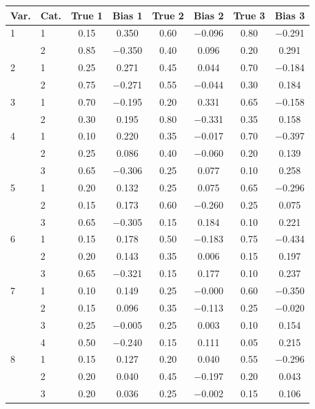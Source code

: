 \begin{table}[H]
\centering
\begin{tabular}{llcccccc}
  \toprule
\textbf{Var.} & \textbf{Cat.} & \textbf{True 1} & \textbf{Bias 1} & \textbf{True 2} & \textbf{Bias 2} & \textbf{True 3} & \textbf{Bias 3} \\ 
  \midrule
1 & 1 & 0.15 & 0.350 & 0.60 & $-$0.096 & 0.80 & $-$0.291 \\ 
   & 2 & 0.85 & $-$0.350 & 0.40 & 0.096 & 0.20 & 0.291 \\ 
  2 & 1 & 0.25 & 0.271 & 0.45 & 0.044 & 0.70 & $-$0.184 \\ 
   & 2 & 0.75 & $-$0.271 & 0.55 & $-$0.044 & 0.30 & 0.184 \\ 
  3 & 1 & 0.70 & $-$0.195 & 0.20 & 0.331 & 0.65 & $-$0.158 \\ 
   & 2 & 0.30 & 0.195 & 0.80 & $-$0.331 & 0.35 & 0.158 \\ 
  4 & 1 & 0.10 & 0.220 & 0.35 & $-$0.017 & 0.70 & $-$0.397 \\ 
   & 2 & 0.25 & 0.086 & 0.40 & $-$0.060 & 0.20 & 0.139 \\ 
   & 3 & 0.65 & $-$0.306 & 0.25 & 0.077 & 0.10 & 0.258 \\ 
  5 & 1 & 0.20 & 0.132 & 0.25 & 0.075 & 0.65 & $-$0.296 \\ 
   & 2 & 0.15 & 0.173 & 0.60 & $-$0.260 & 0.25 & 0.075 \\ 
   & 3 & 0.65 & $-$0.305 & 0.15 & 0.184 & 0.10 & 0.221 \\ 
  6 & 1 & 0.15 & 0.178 & 0.50 & $-$0.183 & 0.75 & $-$0.434 \\ 
   & 2 & 0.20 & 0.143 & 0.35 & 0.006 & 0.15 & 0.197 \\ 
   & 3 & 0.65 & $-$0.321 & 0.15 & 0.177 & 0.10 & 0.237 \\ 
  7 & 1 & 0.10 & 0.149 & 0.25 & $-$0.000 & 0.60 & $-$0.350 \\ 
   & 2 & 0.15 & 0.096 & 0.35 & $-$0.113 & 0.25 & $-$0.020 \\ 
   & 3 & 0.25 & $-$0.005 & 0.25 & 0.003 & 0.10 & 0.154 \\ 
   & 4 & 0.50 & $-$0.240 & 0.15 & 0.111 & 0.05 & 0.215 \\ 
  8 & 1 & 0.15 & 0.127 & 0.20 & 0.040 & 0.55 & $-$0.296 \\ 
   & 2 & 0.20 & 0.040 & 0.45 & $-$0.197 & 0.20 & 0.043 \\ 
   & 3 & 0.20 & 0.036 & 0.25 & $-$0.002 & 0.15 & 0.106 \\ 

\end{tabular}
\end{table}
